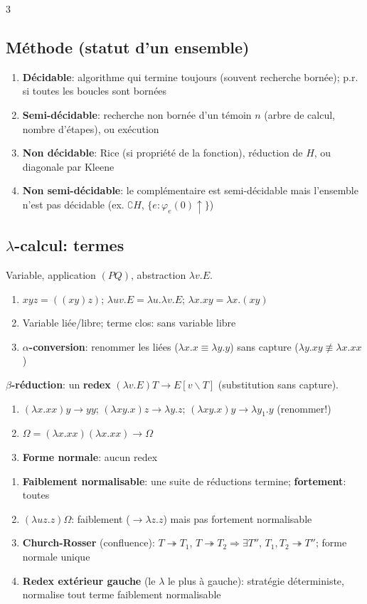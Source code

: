 \documentclass[12pt, a4paper]{article}
\newcommand{\uv}{{\uparrow}}
\newcommand{\ff}{\varphi}
\begin{document}
\begin{multicols*}{3}
	\subsection{Méthode (statut d'un ensemble)}
	\begin{enumerate}[\roman*.]
		\item \textbf{Décidable}: algorithme qui termine toujours (souvent recherche bornée); p.r. si toutes les boucles sont bornées
		\item \textbf{Semi-décidable}: recherche non bornée d'un témoin $n$ (arbre de calcul, nombre d'étapes), ou exécution
		\item \textbf{Non décidable}: Rice (si propriété de la fonction), réduction de $H$, ou diagonale par Kleene
		\item \textbf{Non semi-décidable}: le complémentaire est semi-décidable mais l'ensemble n'est pas décidable (ex. $\complement H$, $\{e:\ff_e(0)\uv\}$)
	\end{enumerate}

	\subsection{$\lambda$-calcul: termes}
	Variable, application $(PQ)$, abstraction $\lambda v.E$.
	\begin{enumerate}[\roman*.]
		\item $xyz=((xy)z)$; $\lambda uv.E=\lambda u.\lambda v.E$; $\lambda x.xy=\lambda x.(xy)$
		\item Variable liée/libre; terme clos: sans variable libre
		\item \textbf{$\alpha$-conversion}: renommer les liées ($\lambda x.x\equiv\lambda y.y$) sans capture ($\lambda y.xy\not\equiv\lambda x.xx$)
	\end{enumerate}
	\textbf{$\beta$-réduction}: un \textbf{redex} $(\lambda v.E)T\to E[v\backslash T]$ (substitution sans capture).
	\begin{enumerate}[\roman*.]
		\item $(\lambda x.xx)y\to yy$; $(\lambda xy.x)z\to\lambda y.z$; $(\lambda xy.x)y\to\lambda y_1.y$ (renommer!)
		\item $\Omega=(\lambda x.xx)(\lambda x.xx)\to\Omega$
		\item \textbf{Forme normale}: aucun redex
	\end{enumerate}

	\colbreak
	\begin{enumerate}[\roman*.]
		\item \textbf{Faiblement normalisable}: une suite de réductions termine; \textbf{fortement}: toutes
		\item $(\lambda uz.z)\Omega$: faiblement ($\to\lambda z.z$) mais pas fortement normalisable
		\item \textbf{Church-Rosser} (confluence): $T\twoheadrightarrow T_1$, $T\twoheadrightarrow T_2\Rightarrow\exists T''$, $T_1,T_2\twoheadrightarrow T''$; forme normale unique
		\item \textbf{Redex extérieur gauche} (le $\lambda$ le plus à gauche): stratégie déterministe, normalise tout terme faiblement normalisable
	\end{enumerate}


\end{multicols*}
\end{document}
